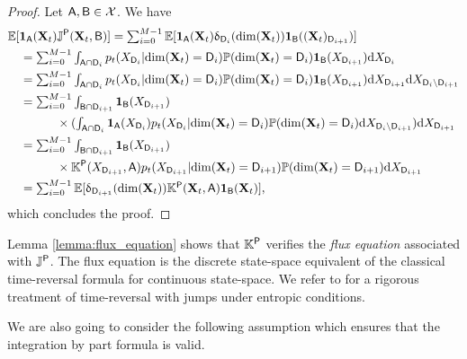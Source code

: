 \begin{proof}
  Let $\mathsf{A}, \mathsf{B} \in \mathcal{X}$. We have
  \begin{align}
    &\mathbb{E}[\mathbf{1}_{\mathsf{A}}(\mathbf{X}_t) \mathbb{J}^{\mathsf{P}}(\mathbf{X}_t, \mathsf{B})] = \textstyle \sum_{i=0}^{M-1} \mathbb{E}[\mathbf{1}_{\mathsf{A}}(\mathbf{X}_t) \updelta_{\mathsf{D}_i}(\mathrm{dim}(\mathbf{X}_t)) \mathbf{1}_{\mathsf{B}}((\mathbf{X}_t)_{\mathsf{D}_{i+1}})]\\
                                                                  &\quad = \textstyle \sum_{i=0}^{M-1} \int_{\mathsf{A} \cap \mathsf{D}_i}  p_t(X_{\mathsf{D}_i}|\mathrm{dim}(\mathbf{X}_t) = \mathsf{D}_i) \mathbb{P}(\mathrm{dim}(\mathbf{X}_t)=\mathsf{D}_i) \mathbf{1}_{\mathsf{B}}(X_{\mathsf{D}_{i+1}})  \mathrm{d} X_{\mathsf{D}_i} \\ 
    &\quad = \textstyle \sum_{i=0}^{M-1} \int_{\mathsf{A} \cap \mathsf{D}_i} p_t(X_{\mathsf{D}_i}|\mathrm{dim}(\mathbf{X}_t) = \mathsf{D}_i)\mathbb{P}(\mathrm{dim}(\mathbf{X}_t)=\mathsf{D}_i)  \mathbf{1}_{\mathsf{B}}(X_{\mathsf{D}_{i+1}}) \mathrm{d} X_{\mathsf{D}_{i+1}} \mathrm{d} X_{\mathsf{D}_i \backslash \mathsf{D}_{i+1}}    \\
    &\quad = \textstyle \sum_{i=0}^{M-1} \int_{\mathsf{B} \cap \mathsf{D}_{i+1}}  \mathbf{1}_{\mathsf{B}}(X_{\mathsf{D}_{i+1}})\\
    & \qquad \qquad \textstyle \times  (\int_{\mathsf{A} \cap \mathsf{D}_i} \mathbf{1}_{\mathsf{A}}(X_{\mathsf{D}_i}) p_t(X_{\mathsf{D}_i}|\mathrm{dim}(\mathbf{X}_t) = \mathsf{D}_i)  \mathbb{P}(\mathrm{dim}(\mathbf{X}_t)=\mathsf{D}_i) \mathrm{d} X_{\mathsf{D}_i \backslash \mathsf{D}_{i+1}} )  \mathrm{d} X_{\mathsf{D}_{i+1}} \\
    &\quad = \textstyle \sum_{i=0}^{M-1} \int_{\mathsf{B} \cap \mathsf{D}_{i+1}} \mathbf{1}_{\mathsf{B}}(X_{\mathsf{D}_{i+1}}) \\
    & \qquad \qquad \times \mathbb{K}^{\mathsf{P}}(X_{\mathsf{D}_{i+1}}, \mathsf{A}) p_t(X_{\mathsf{D}_{i+1}}|\mathrm{dim}(\mathbf{X}_t) = \mathsf{D}_{i+1}) \mathbb{P}(\mathrm{dim}(\mathbf{X}_t) = \mathsf{D}_{i+1})  \mathrm{d} X_{\mathsf{D}_{i+1}} \\
    &\quad = \textstyle \sum_{i=0}^{M-1} \mathbb{E}[\updelta_{\mathsf{D}_{i+1}}(\mathrm{dim}(\mathbf{X}_t)) \mathbb{K}^{\mathsf{P}}(\mathbf{X}_t, \mathsf{A}) \mathbf{1}_{\mathsf{B}}(\mathbf{X}_t)] ,
  \end{align}
  which concludes the proof.
\end{proof}

Lemma \ref{lemma:flux_equation} shows that $\mathbb{K}^{\mathsf{P}}$ verifies the \emph{flux
  equation} associated with $\mathbb{J}^{\mathsf{P}}$. The flux equation is the discrete
state-space equivalent of the classical time-reversal formula for continuous
state-space. We refer to \citet{conforti2022time} for a rigorous treatment of
time-reversal with jumps under entropic conditions. 

We are also going to consider the following assumption which ensures that the
integration by part formula is valid.

